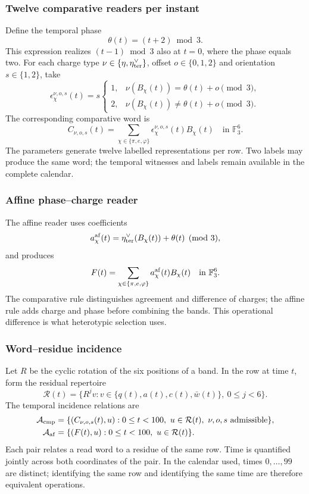 \subsubsection{Twelve comparative readers per instant}

Define the temporal phase
\[
 \theta(t)=(t+2)\bmod3.
\]
This expression realizes $(t-1)\bmod3$ also at $t=0$, where the phase
equals two. For each charge type
$\nu\in\{\eta,\eta_{\rm ter}^\vee\}$, offset
$o\in\{0,1,2\}$ and orientation $s\in\{1,2\}$, take
\[
 \epsilon_\chi^{\nu,o,s}(t)=s
 \begin{cases}
 1,&\nu(B_\chi(t))=\theta(t)+o\pmod3,\\
 2,&\nu(B_\chi(t))\ne\theta(t)+o\pmod3.
 \end{cases}
\]
The corresponding comparative word is
\begin{equation}
 C_{\nu,o,s}(t)=
 \sum_{\chi\in\{\pi,e,\varphi\}}
 \epsilon_\chi^{\nu,o,s}(t)B_\chi(t)
 \quad\text{in }\mathbb F_3^6.
 \label{act21:eq:kdes-comparativo}
\end{equation}
The parameters generate twelve labelled representations per row. Two
labels may produce the same word; the temporal witnesses and
labels remain available in the complete calendar.

\subsubsection{Affine phase--charge reader}

The affine reader uses coefficients
\[
 a_\chi^{\rm af}(t)=\eta_{\rm ter}^\vee(B_\chi(t))+\theta(t)
 \pmod3,
\]
and produces
\begin{equation}
 F(t)=\sum_{\chi\in\{\pi,e,\varphi\}}
 a_\chi^{\rm af}(t)B_\chi(t)
 \quad\text{in }\mathbb F_3^6.
 \label{act21:eq:kdes-afin}
\end{equation}
The comparative rule distinguishes agreement and difference of charges;
the affine rule adds charge and phase before combining the bands. This operational
difference is what heterotypic selection uses.

\subsubsection{Word--residue incidence}

Let $R$ be the cyclic rotation of the six positions of a band. In the
row at time $t$, form the residual repertoire
\[
 \mathcal R(t)=\{R^jv:
      v\in\{q(t),a(t),c(t),\bar w(t)\},\ 0\leq j<6\}.
\]
The temporal incidence relations are
\begin{align}
 \mathcal A_{\rm cmp}
 &=\{(C_{\nu,o,s}(t),u):
      0\leq t<100,\ u\in\mathcal R(t),\ \nu,o,s\text{ admissible}\},\\
 \mathcal A_{\rm af}
 &=\{(F(t),u):0\leq t<100,\ u\in\mathcal R(t)\}.
 \label{act21:eq:kdes-atlas}
\end{align}
Each pair relates a read word to a residue of the same row.
Time is quantified jointly across both coordinates of the pair.
In the calendar used, times $0,\ldots,99$ are distinct;
identifying the same row and identifying the same time are therefore
equivalent operations.

